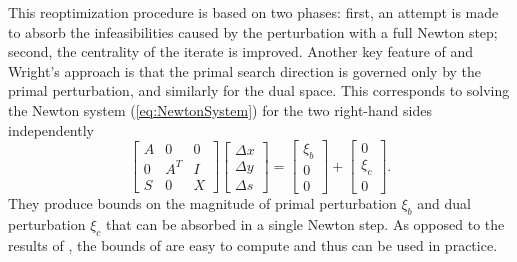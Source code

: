 
This reoptimization procedure is based on two phases: first, an attempt 
is made to absorb the infeasibilities caused by the perturbation with a full 
Newton step; second, the centrality of the iterate is improved. Another 
key feature of \yildirim and Wright's approach is that the primal search 
direction is governed only by the primal perturbation, and similarly 
for the dual space. This corresponds to solving the Newton system 
(\ref{eq:NewtonSystem}) for the two right-hand sides independently
%
\[
\left[ \begin{array}{ccc}
    A & 0 & 0 \\ 0 &A^T & I \\ S & 0 & X
  \end{array} \right]
\left[ \begin{array}{c}
    \Delta x \\ \Delta y \\ \Delta s
  \end{array} \right] = 
\left[ \begin{array}{c}
    \xi_b \\ 0 \\ 0
  \end{array} \right] +
\left[ \begin{array}{c}
    0 \\ \xi_c \\ 0
  \end{array} \right].
\]
%
They produce bounds on the magnitude of primal perturbation $\xi_b$ 
and dual perturbation $\xi_c$ that can be absorbed in a single 
Newton step. As opposed to the results of \cite{YildirimWright}, 
the bounds of \cite{GondzioGrothey03} are easy to compute and 
thus can be used in practice.

